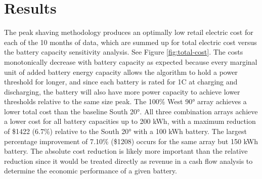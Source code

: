 \documentclass[journal,article,submit,pdftex,moreauthors]{Definitions/mdpi}
\begin{document}
\section{Results}\label{results}%

The peak shaving methodology produces an optimally low retail electric cost for each of the 10 months of data, which are summed up for total electric cost versus the battery capacity sensitivity analysis. See Figure \ref{fig:total-cost}. The costs monotonically decrease with battery capacity as expected because every marginal unit of added battery energy capacity allows the algorithm to hold a power threshold for longer, and since each battery is rated for 1C at charging and discharging, the battery will also have more power capacity to achieve lower thresholds relative to the same size peak. The 100\% West 90° array achieves a lower total cost than the baseline South 20°. All three combination arrays achieve a lower cost for all battery capacities up to 200 kWh, with a maximum reduction of \$1422 (6.7\%) relative to the South 20° with a 100 kWh battery. The largest percentage improvement of 7.10\% (\$1208) occurs for the same array but 150 kWh battery. The absolute cost reduction is likely more important than the relative reduction since it would be treated directly as revenue in a cash flow analysis to determine the economic performance of a given battery.
\end{document}
